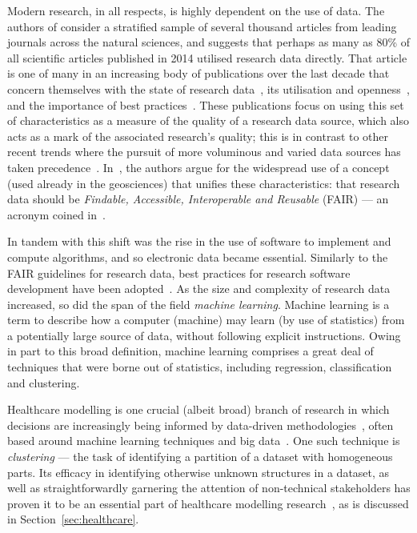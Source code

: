 Modern research, in all respects, is highly dependent on the use of data. The
authors of \cite{Womack2015} consider a stratified sample of several thousand
articles from leading journals across the natural sciences, and suggests that
perhaps as many as 80\% of all scientific articles published in 2014 utilised
research data directly. That article is one of many in an increasing body of
publications over the last decade that concern themselves with the state of
research data~\cite{Higman2019}, its utilisation and
openness~\cite{Aslam2017,Zuiderwijk2020}, and the importance of best
practices~\cite{Colavizza2020,Corti2019}. These publications focus on using this
set of characteristics as a measure of the quality of a research data source,
which also acts as a mark of the associated research's quality; this is in
contrast to other recent trends where the pursuit of more voluminous and varied
data sources has taken precedence~\cite{Batistic2019}. In~\cite{Stall2019}, the
authors argue for the widespread use of a concept (used already in the
geosciences) that unifies these characteristics: that research data should be
\emph{Findable, Accessible, Interoperable and Reusable} (FAIR) --- an acronym
coined in~\cite{Wilkinson2016}.

In tandem with this shift was the rise in the use of software to implement and
compute algorithms, and so electronic data became essential. Similarly to the
FAIR guidelines for research data, best practices for research software
development have been adopted~\cite{Aberdour2007,Benureau2018,Jimenez2017}. As
the size and complexity of research data increased, so did the span of the field
\emph{machine learning}. Machine learning is a term to describe how a computer
(machine) may learn (by use of statistics) from a potentially large source of
data, without following explicit instructions. Owing in part to this broad
definition, machine learning comprises a great deal of techniques that were
borne out of statistics, including regression, classification and clustering.

Healthcare modelling is one crucial (albeit broad) branch of research in which
decisions are increasingly being informed by data-driven
methodologies~\cite{Belle2015,Katsaliaki2011,RiosZertuche2020}, often based
around machine learning techniques and big
data~\cite{Alexander2018,Archenaa2015}. One such technique is \emph{clustering}
--- the task of identifying a partition of a dataset with homogeneous parts. Its
efficacy in identifying otherwise unknown structures in a dataset, as well as
straightforwardly garnering the attention of non-technical stakeholders has
proven it to be an essential part of healthcare modelling
research~\cite{Tomar2013,Yoo2011}, as is discussed in
Section~\ref{sec:healthcare}.

